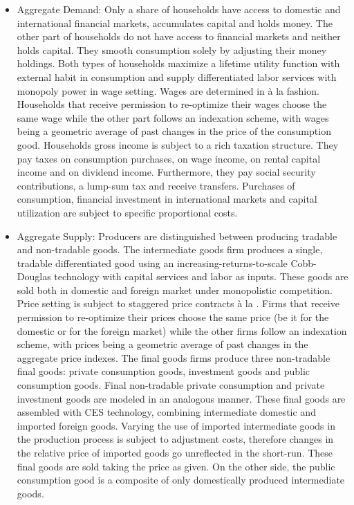 \documentclass[11pt,a4paper]{article}
\begin{document}
	\begin{itemize}
		
		\item Aggregate Demand: Only a share of households have access to domestic and international financial markets, accumulates capital and holds money. The other part of households do not have access to financial markets and neither holds capital. They smooth consumption solely by adjusting their money holdings. Both types of households maximize a lifetime utility function with external habit in consumption and supply differentiated labor services with monopoly power in wage setting. Wages are determined in \`{a} la \cite{Calvo1983} fashion. Households that receive permission to re-optimize their wages choose the same wage while the other part follows an indexation scheme, with wages being a geometric average of past changes in the price of the consumption good. Households gross income is subject to a rich taxation structure. They pay taxes on consumption purchases, on wage income, on rental capital income and on dividend income. Furthermore, they pay social security contributions, a lump-sum tax and receive transfers. Purchases of consumption, financial investment in international markets and capital utilization are subject to specific proportional costs.
		
		\item Aggregate Supply: Producers are distinguished between producing tradable and non-tradable goods. The intermediate goods firm produces a single, tradable differentiated good using an increasing-returns-to-scale Cobb-Douglas technology with capital services and labor as inputs. These goods are sold both in domestic and foreign market under monopolistic competition. Price setting is subject to staggered price contracts \`{a} la \cite{Calvo1983}. Firms that receive permission to re-optimize their prices choose the same price (be it for the domestic or for the foreign market) while the other firms follow an indexation scheme, with prices being a geometric average of past changes in the aggregate price indexes. The final goods firms produce three non-tradable final goods: private consumption goods, investment goods and public consumption goods. Final non-tradable private consumption and private investment goods are modeled in an analogous manner. These final goods are assembled with CES technology, combining intermediate domestic and imported foreign goods. Varying the use of imported intermediate goods in the production process is subject to adjustment costs, therefore changes in the relative price of imported goods go unreflected in the short-run. These final goods are sold taking the price as given. On the other side, the public consumption good is a composite of only domestically produced intermediate goods.
		

\end{itemize}
\end{document}

